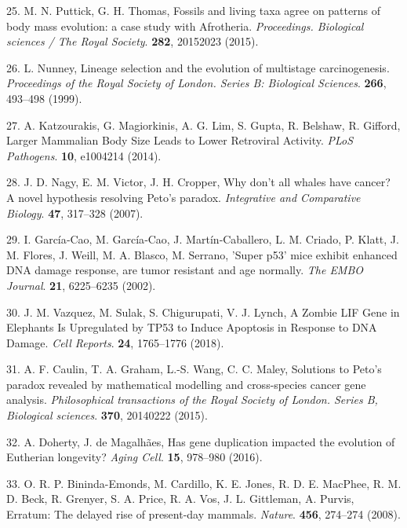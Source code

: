 \documentclass[]{elsarticle} %
\begin{document}
\leavevmode\hypertarget{ref-PuttickAndThomas2015}{}%
25. M. N. Puttick, G. H. Thomas, Fossils and living taxa agree on patterns of body mass evolution: a case study with Afrotheria. \emph{Proceedings. Biological sciences / The Royal Society}. \textbf{282}, 20152023 (2015).

\leavevmode\hypertarget{ref-Nunney1999}{}%
26. L. Nunney, Lineage selection and the evolution of multistage carcinogenesis. \emph{Proceedings of the Royal Society of London. Series B: Biological Sciences}. \textbf{266}, 493--498 (1999).

\leavevmode\hypertarget{ref-Katzourakis2014}{}%
27. A. Katzourakis, G. Magiorkinis, A. G. Lim, S. Gupta, R. Belshaw, R. Gifford, Larger Mammalian Body Size Leads to Lower Retroviral Activity. \emph{PLoS Pathogens}. \textbf{10}, e1004214 (2014).

\leavevmode\hypertarget{ref-Nagy2007}{}%
28. J. D. Nagy, E. M. Victor, J. H. Cropper, Why don't all whales have cancer? A novel hypothesis resolving Peto's paradox. \emph{Integrative and Comparative Biology}. \textbf{47}, 317--328 (2007).

\leavevmode\hypertarget{ref-GarciaCao:20021c2}{}%
29. I. García‐Cao, M. García‐Cao, J. Martín‐Caballero, L. M. Criado, P. Klatt, J. M. Flores, J. Weill, M. A. Blasco, M. Serrano, 'Super p53' mice exhibit enhanced DNA damage response, are tumor resistant and age normally. \emph{The EMBO Journal}. \textbf{21}, 6225--6235 (2002).

\leavevmode\hypertarget{ref-Vazquez2018}{}%
30. J. M. Vazquez, M. Sulak, S. Chigurupati, V. J. Lynch, A Zombie LIF Gene in Elephants Is Upregulated by TP53 to Induce Apoptosis in Response to DNA Damage. \emph{Cell Reports}. \textbf{24}, 1765--1776 (2018).

\leavevmode\hypertarget{ref-Caulin2015}{}%
31. A. F. Caulin, T. A. Graham, L.-S. Wang, C. C. Maley, Solutions to Peto's paradox revealed by mathematical modelling and cross-species cancer gene analysis. \emph{Philosophical transactions of the Royal Society of London. Series B, Biological sciences}. \textbf{370}, 20140222 (2015).

\leavevmode\hypertarget{ref-Doherty2016}{}%
32. A. Doherty, J. de Magalhães, Has gene duplication impacted the evolution of Eutherian longevity? \emph{Aging Cell}. \textbf{15}, 978--980 (2016).

\leavevmode\hypertarget{ref-Bininda-Emonds2008}{}%
33. O. R. P. Bininda-Emonds, M. Cardillo, K. E. Jones, R. D. E. MacPhee, R. M. D. Beck, R. Grenyer, S. A. Price, R. A. Vos, J. L. Gittleman, A. Purvis, Erratum: The delayed rise of present-day mammals. \emph{Nature}. \textbf{456}, 274--274 (2008).
\end{document}
